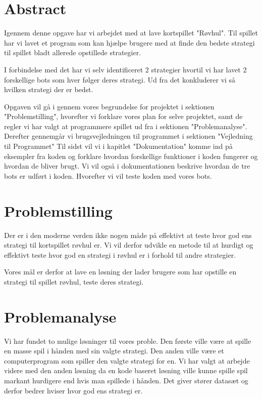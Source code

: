 \documentclass[a4paper, 12pt]{article}
\begin{document}
\section{Abstract}

Igennem denne opgave har vi arbejdet med at lave kortspillet "Røvhul". Til spillet har vi lavet et program som kan hjælpe brugere med at finde den bedste strategi til spillet bladt allerede opstillede strategier. 

I forbindelse med det har vi selv identificeret 2 strategier hvortil vi har lavet 2 forskellige bots som hver følger deres strategi. Ud fra det konkluderer vi så hvilken strategi der er bedst.

Opgaven vil gå i gennem vores begrundelse for projektet i sektionen "Problemstilling", hvorefter vi forklare vores plan for selve projektet, samt de regler vi har valgt at programmere spillet ud fra i sektionen "Problemanalyse". 
\bigbreak
Derefter gennemgår vi brugsvejledningen til programmet i sektionen "Vejledning til Programmet"
\bigbreak
Til sidst vil vi i kapitlet "Dokumentation" komme ind på eksempler fra koden og forklare hvordan forskellige funktioner i koden fungerer og hvordan de bliver brugt. Vi vil også i dokumentationen beskrive hvordan de tre bots er udført i koden. Hvorefter vi vil teste koden med vores bots. 

\section{Problemstilling}

Der er i den moderne verden ikke nogen måde på effektivt at teste hvor god ens strategi til kortspillet røvhul er. Vi vil derfor udvikle en metode til at hurdigt og effektivt teste hvor god en strategi i røvhul er i forhold til andre strategier.

Vores mål er derfor at lave en løsning der lader brugere som har opstille en strategi til spillet røvhul, teste deres strategi.

\section{Problemanalyse}

Vi har fundet to mulige løsninger til vores proble. Den første ville være at spille en masse spil i hånden med sin valgte strategi. Den anden ville være et computerprogram som spiller den valgte strategi for en. Vi har valgt at arbejde videre med den anden løsning da en kode baseret løsning ville kunne spille spil markant hurdigere end hvis man spillede i hånden. Det giver stører datasæt og derfor bedrer hviser hvor god ens strategi er.
\end{document}
